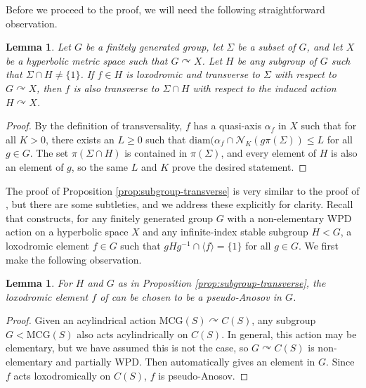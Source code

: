 \documentclass[11pt,letterpaper]{amsart}
\newtheorem{lemma}[theorem]{Lemma}
\theoremstyle{definition}
\theoremstyle{plain}
\theoremstyle{TheoremNum}
\begin{document}
Before we proceed to the proof, we will need the following straightforward observation.
\begin{lemma}\label{lem:transverse-in-subgroup}
    Let $G$ be a finitely generated group, let $\Sigma$ be a subset of $G$, and let $X$ be a hyperbolic metric space such that $G \curvearrowright X$. Let $H$ be any subgroup of $G$ such that $\Sigma \cap H \neq \{1\}$. If $f \in H$ is loxodromic and transverse to $\Sigma$ with respect to $G \curvearrowright X$, then $f$ is also transverse to $\Sigma \cap H$ with respect to the induced action $H \curvearrowright X$.
\end{lemma}
\begin{proof}
    By the definition of transversality, $f$ has a quasi-axis $\alpha_f$ in $X$ such that for all $K >0$, there exists an $L \geq 0$ such that $\text{diam}(\alpha_f \cap \mathcal{N}_K(g \pi(\Sigma)) \leq L$ for all $g \in G$. The set $\pi(\Sigma \cap H)$ is contained in $\pi(\Sigma)$, and every element of $H$ is also an element of $g$, so the same $L$ and $K$ prove the desired statement. 
\end{proof}

The proof of Proposition \ref{prop:subgroup-transverse} is very similar to the proof of \cite[Proposition~6.9]{Abbott-Hull}, but there are some subtleties, and we address these explicitly for clarity. Recall that \cite[Theorem~5.1]{Abbott-Hull} constructs, for any finitely generated group $G$ with a non-elementary WPD action on a hyperbolic space $X$ and any infinite-index stable subgroup $H < G$, a loxodromic element $f \in G$ such that $g H g^{-1} \cap \langle f \rangle = \{1\}$ for all $g \in G$. We first make the following observation.
\begin{lemma}\label{lem:pA-in-G}
    For $H$ and $G$ as in Proposition \ref{prop:subgroup-transverse}, the loxodromic element $f$ of \cite[Theorem~5.1]{Abbott-Hull} can be chosen to be a pseudo-Anosov in $G$.
\end{lemma}
\begin{proof}
    Given an acylindrical action $\mathrm{MCG}(S) \curvearrowright C(S)$, any subgroup $G < \mathrm{MCG}(S)$ also acts acylindrically on $C(S)$. In general, this action may be elementary, but we have assumed this is not the case, so $G \curvearrowright C(S)$ is non-elementary and partially WPD. Then \cite[Theorem~5.1]{Abbott-Hull} automatically gives an element in $G$. Since $f$ acts loxodromically on $C(S)$, $f$ is pseudo-Anosov.
\end{proof}
\end{document}
